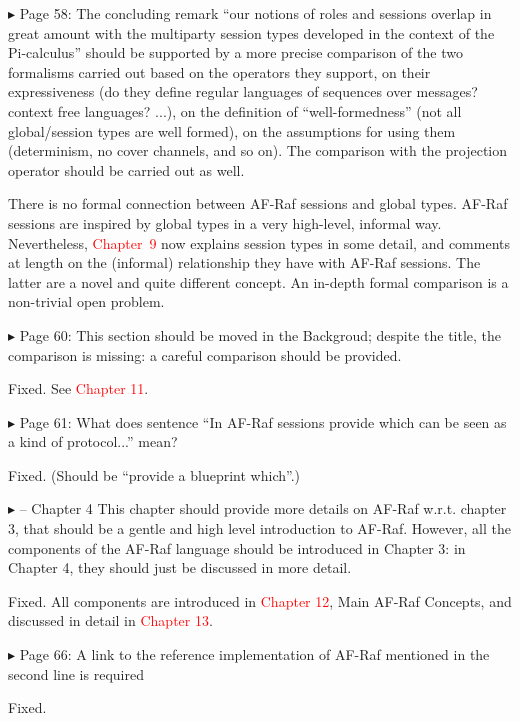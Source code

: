 \documentclass{article}
\newcommand*\R[1]{\textcolor{red}{#1}} %
\newenvironment{them}%
  {\bigskip\noindent\begingroup\color{blue}$\blacktriangleright$\enspace}%
  {\endgroup\par}
\begin{document}
\begin{them}
Page 58:
The concluding remark ``our notions of roles and sessions overlap in great
amount with the multiparty session types developed in the context of the
Pi-calculus'' should be supported by a more precise comparison of the two
formalisms carried out based on the operators they support, on their
expressiveness (do they define regular languages of sequences over messages?
context free languages? ...), on the definition of ``well-formedness'' (not all
global/session types are well formed), on the assumptions for using them
(determinism, no cover channels, and so on). The comparison with the projection
operator should be carried out as well.
\end{them}

There is no formal connection between AF-Raf sessions and global types.
AF-Raf sessions are inspired by global types in a very high-level,
  informal way.
Nevertheless,
  \R{Chapter~9} now explains session types in some detail,
  and comments at length on the (informal) relationship they have with
    AF-Raf sessions.
The latter are a novel and quite different concept.
An in-depth formal comparison is a non-trivial open problem.


\begin{them}
Page 60:
This section should be moved in the Backgroud; despite the title, the
comparison is missing: a careful comparison should be provided.
\end{them}
Fixed. See \R{Chapter 11}.

\begin{them}
Page 61:
What does sentence ``In AF-Raf sessions provide which can be seen as a kind of
protocol...'' mean?
\end{them}
Fixed.
(Should be ``provide a blueprint which''.)

\begin{them}
-- Chapter 4
This chapter should provide more details on AF-Raf w.r.t. chapter 3, that
should be a gentle and high level introduction to AF-Raf. However, all the
components of the AF-Raf language should be introduced in Chapter 3: in Chapter
4, they should just be discussed in more detail.
\end{them}
Fixed. All components are introduced in \R{Chapter 12}, Main AF-Raf Concepts, and discussed in detail in \R{Chapter 13}.

\begin{them}
Page 66:
A link to the reference implementation of AF-Raf mentioned in the second line
is required
\end{them}
Fixed.
\end{document}
